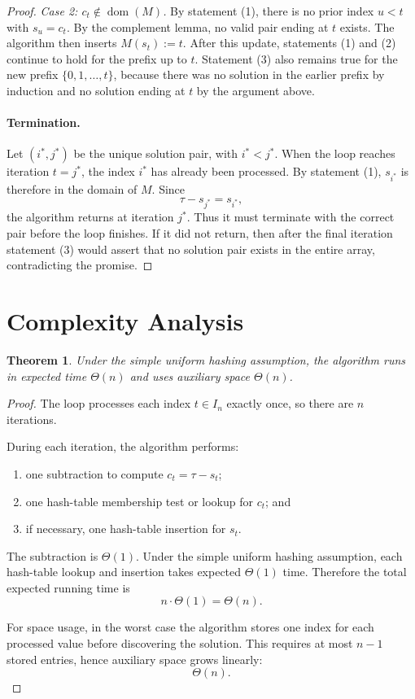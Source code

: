 \documentclass[11pt]{article}
\newtheorem{theorem}{Theorem}
\theoremstyle{remark}
\begin{document}
\begin{proof}
\emph{Case 2: \(c_t \notin \operatorname{dom}(M)\).}
By statement (1), there is no prior index \(u < t\) with \(s_u = c_t\). By the complement lemma, no valid pair ending at \(t\) exists. The algorithm then inserts \(M(s_t) := t\). After this update, statements (1) and (2) continue to hold for the prefix up to \(t\). Statement (3) also remains true for the new prefix \(\{0,1,\dots,t\}\), because there was no solution in the earlier prefix by induction and no solution ending at \(t\) by the argument above.

\paragraph{Termination.}
Let \((i^\ast,j^\ast)\) be the unique solution pair, with \(i^\ast < j^\ast\). When the loop reaches iteration \(t = j^\ast\), the index \(i^\ast\) has already been processed. By statement (1), \(s_{i^\ast}\) is therefore in the domain of \(M\). Since
\[
\tau - s_{j^\ast} = s_{i^\ast},
\]
the algorithm returns at iteration \(j^\ast\). Thus it must terminate with the correct pair before the loop finishes. If it did not return, then after the final iteration statement (3) would assert that no solution pair exists in the entire array, contradicting the promise.
\end{proof}

\section{Complexity Analysis}

\begin{theorem}
Under the simple uniform hashing assumption, the algorithm runs in expected time \(\Theta(n)\) and uses auxiliary space \(\Theta(n)\).
\end{theorem}

\begin{proof}
The loop processes each index \(t \in I_n\) exactly once, so there are \(n\) iterations.

During each iteration, the algorithm performs:
\begin{enumerate}
    \item one subtraction to compute \(c_t = \tau - s_t\);
    \item one hash-table membership test or lookup for \(c_t\); and
    \item if necessary, one hash-table insertion for \(s_t\).
\end{enumerate}
The subtraction is \(\Theta(1)\). Under the simple uniform hashing assumption, each hash-table lookup and insertion takes expected \(\Theta(1)\) time. Therefore the total expected running time is
\[
n \cdot \Theta(1) = \Theta(n).
\]

For space usage, in the worst case the algorithm stores one index for each processed value before discovering the solution. This requires at most \(n-1\) stored entries, hence auxiliary space grows linearly:
\[
\Theta(n).
\]
\end{proof}
\end{document}
